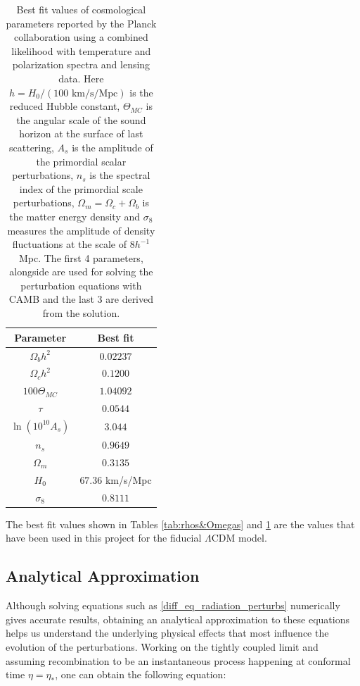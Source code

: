 \documentclass[openany,a4paper,12pt,oneside]{book}
\begin{document}
\begin{spacing}{1.5}
\begin{table}[!htb]
    \centering
    \begin{tabular}{cc} \hline
     Parameter & Best fit \\ \hline
     $\Omega_b h^2$ & $0.02237$\\
     $\Omega_c h^2$ & $0.1200$\\
     $100\Theta_{MC}$ & $1.04092$ \\
     $\tau$ & $0.0544$\\ 
     $\ln{(10^{10}A_s)}$ & $3.044$ \\ 
     $n_s$ & $0.9649$ \\ \hline
     $\Omega_m$ & $0.3135$ \\
     $H_0$ & $67.36$ km/s/Mpc \\
     $\sigma_8$ & $0.8111$ \\ \hline
    \end{tabular}
    \caption{Best fit values of cosmological parameters reported by the Planck collaboration using a combined likelihood with temperature and polarization spectra and lensing data. Here $h=H_0/(100\text{ km/s/Mpc})$ is the reduced Hubble constant, $\Theta_{MC}$ is the angular scale of the sound horizon at the surface of last scattering, $A_s$ is the amplitude of the primordial scalar perturbations, $n_s$ is the spectral index of the primordial scale perturbations, $\Omega_m=\Omega_c+\Omega_b$ is the matter energy density and $\sigma_8$ measures the amplitude of density fluctuations at the scale of $8h^{-1}$ Mpc. The first 4 parameters, alongside  are used for solving the perturbation equations with CAMB and the last 3 are derived from the solution.}
    \label{tab:planck_parameters}
\end{table}

The best fit values shown in Tables \ref{tab:rhos&Omegas} and \ref{tab:planck_parameters} are the values that have been used in this project for the fiducial $\Lambda$CDM model.

\subsection{Analytical Approximation}

Although solving equations such as \eqref{diff_eq_radiation_perturbs} numerically gives accurate results, obtaining an analytical approximation to these equations helps us understand the underlying physical effects that most influence the evolution of the perturbations. Working on the tightly coupled limit and assuming recombination to be an instantaneous process happening at conformal time $\eta=\eta_*$, one can obtain the following equation\cite{dodelson2020modern}:


\end{spacing}
\end{document}
